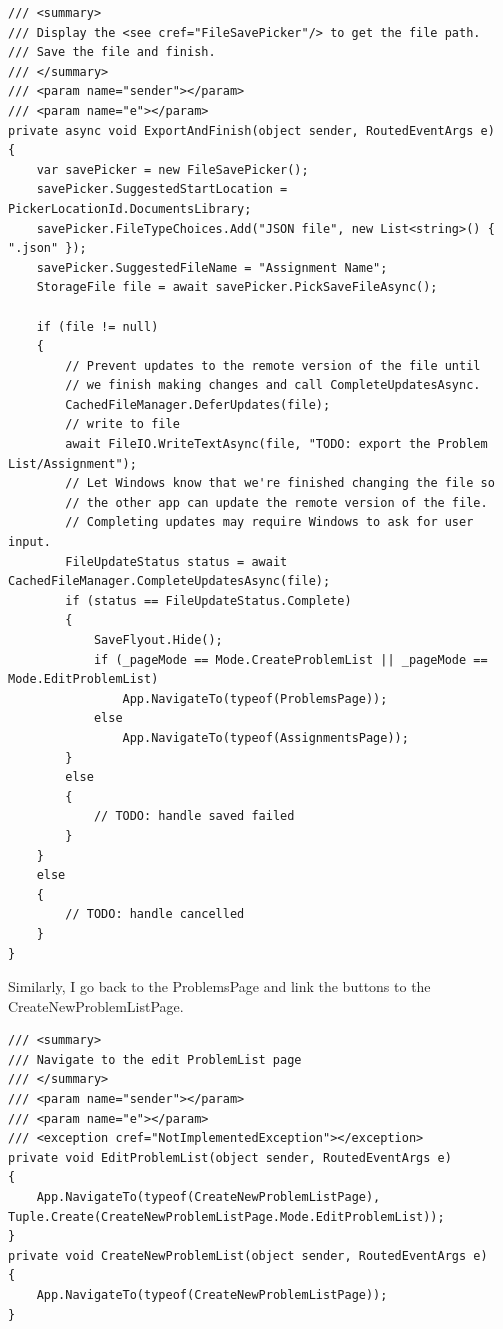 \documentclass[a4paper]{report}
\begin{document}
\begin{verbatim}
/// <summary>
/// Display the <see cref="FileSavePicker"/> to get the file path.
/// Save the file and finish.
/// </summary>
/// <param name="sender"></param>
/// <param name="e"></param>
private async void ExportAndFinish(object sender, RoutedEventArgs e)
{
    var savePicker = new FileSavePicker();
    savePicker.SuggestedStartLocation = PickerLocationId.DocumentsLibrary;
    savePicker.FileTypeChoices.Add("JSON file", new List<string>() { ".json" });
    savePicker.SuggestedFileName = "Assignment Name";
    StorageFile file = await savePicker.PickSaveFileAsync();

    if (file != null)
    {
        // Prevent updates to the remote version of the file until
        // we finish making changes and call CompleteUpdatesAsync.
        CachedFileManager.DeferUpdates(file);
        // write to file
        await FileIO.WriteTextAsync(file, "TODO: export the Problem List/Assignment");
        // Let Windows know that we're finished changing the file so
        // the other app can update the remote version of the file.
        // Completing updates may require Windows to ask for user input.
        FileUpdateStatus status = await CachedFileManager.CompleteUpdatesAsync(file);
        if (status == FileUpdateStatus.Complete)
        {
            SaveFlyout.Hide();
            if (_pageMode == Mode.CreateProblemList || _pageMode == Mode.EditProblemList)
                App.NavigateTo(typeof(ProblemsPage));
            else
                App.NavigateTo(typeof(AssignmentsPage));
        }
        else
        {
            // TODO: handle saved failed
        }
    }
    else
    {
        // TODO: handle cancelled
    }
}
\end{verbatim}

Similarly, I go back to the ProblemsPage and link the buttons to the CreateNewProblemListPage.

\begin{verbatim}
/// <summary>
/// Navigate to the edit ProblemList page
/// </summary>
/// <param name="sender"></param>
/// <param name="e"></param>
/// <exception cref="NotImplementedException"></exception>
private void EditProblemList(object sender, RoutedEventArgs e)
{
    App.NavigateTo(typeof(CreateNewProblemListPage), Tuple.Create(CreateNewProblemListPage.Mode.EditProblemList));
}
private void CreateNewProblemList(object sender, RoutedEventArgs e)
{
    App.NavigateTo(typeof(CreateNewProblemListPage));
}
\end{verbatim}
\end{document}
